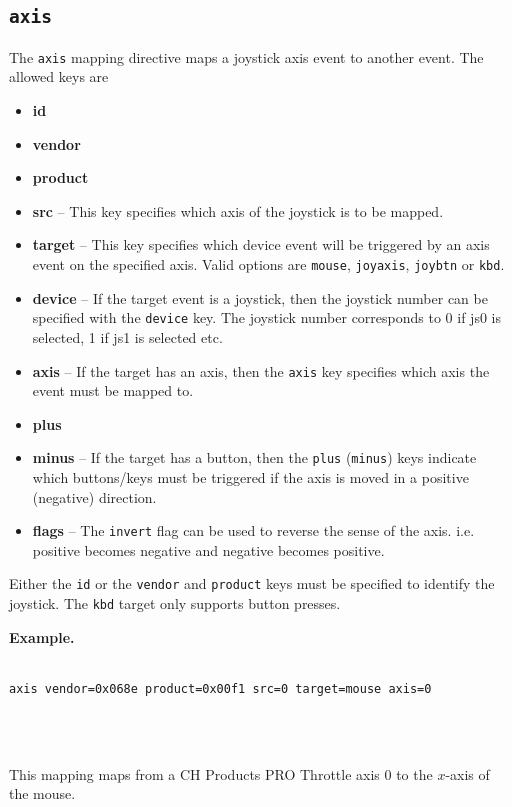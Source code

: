 \documentclass{article}
\begin{document}
\subsection{{\tt axis}}
The {\tt axis} mapping directive maps a joystick axis event 
to another event. The allowed keys are 
\begin{itemize}
	\item {\bf id}
	\item {\bf vendor}
	\item {\bf product}
	\item {\bf src} -- This key specifies which axis of the joystick is to be mapped.
	\item {\bf target} -- This key specifies which device event will be triggered
				by an axis event on the specified axis. Valid
				options are {\tt mouse}, {\tt joyaxis}, {\tt joybtn} or {\tt kbd}.
	\item {\bf device} -- If the target event is a joystick, then the joystick 
				number can be specified with the {\tt device} key.
				The joystick number corresponds to 0 if js0 is selected, 1 if js1 is selected etc.
	\item {\bf axis} -- If the target has an axis, then the {\tt axis} key specifies
				which axis the event must be mapped to.
	\item {\bf plus} 
	\item {\bf minus} -- If the target has a button, then the {\tt plus} ({\tt minus})
				keys indicate which buttons/keys must be triggered
				if the axis is moved in a positive (negative) direction.
	\item {\bf flags} -- The {\tt invert} flag can be used to reverse the sense of the
				axis. i.e. positive becomes negative and negative becomes positive.
\end{itemize}
Either the {\tt id} or the {\tt vendor} and {\tt product} keys must be specified to identify the
joystick. The {\tt kbd} target only supports button presses.

{\bf Example.}\\
\strut\\
{\tt axis vendor=0x068e product=0x00f1 src=0 target=mouse axis=0}
\strut\\
\strut\\
This mapping maps from a CH Products PRO Throttle axis 0 to the $x$-axis of the mouse.
\end{document}
